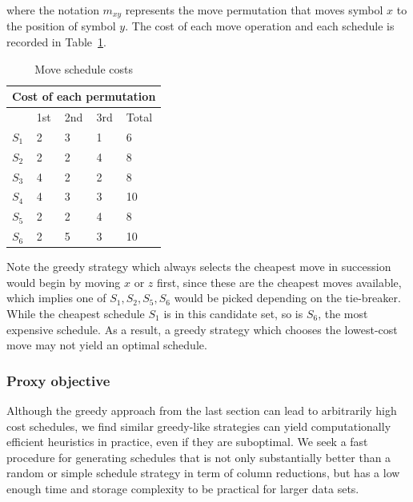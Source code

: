 \documentclass[sn-mathphys]{sn-jnl}
\begin{document}
where the notation $m_{x y}$ represents the move permutation that moves symbol $x$ to the position of symbol $y$. The cost of each  move operation and each schedule is recorded in Table~\ref{table:move_costs}.
\begin{table}[h]
\caption{Move schedule costs}
\centering
\begin{tabular}{ m{0.4cm} m{0.8cm} m{0.8cm} m{0.8cm} m{0.8cm}  }
 \hline
 \multicolumn{5}{c}{Cost of each permutation} \\
 \hline
 & 1st & 2nd & 3rd & Total\\
 \hline
 $S_1$ & 2 & 3 & 1 & 6 \\
 \hline 
 $S_2$ & 2 & 2 & 4 & 8 \\
  \hline 
 $S_3$ & 4 & 2 & 2 & 8 \\
  \hline 
 $S_4$ & 4 & 3 & 3 & 10 \\
  \hline 
 $S_5$ & 2 & 2 & 4 & 8  \\
  \hline 
 $S_6$ & 2 & 5 & 3 & 10\\
 \hline
\end{tabular}
\label{table:move_costs}
\end{table}
Note the greedy strategy which always selects the cheapest move in succession would begin by moving $x$ or $z$ first, since these are the cheapest moves available, which implies one of $S_1, S_2, S_5, S_6$ would be picked depending on the tie-breaker. While the cheapest schedule $S_1$ is in this candidate set, so is $S_6$, the most expensive schedule. As a result, a greedy strategy which chooses the lowest-cost move may not yield an optimal schedule. 

\subsubsection{Proxy objective}\label{sec:proxy_objective}
Although the greedy approach from the last section can lead to arbitrarily high cost schedules, we find similar greedy-like strategies can yield computationally efficient heuristics in practice, even if they are suboptimal. 
We seek a fast procedure for generating schedules that is not only substantially better than a random or simple schedule strategy in term of column reductions, but has a low enough time and storage complexity to be practical for larger data sets.
\end{document}
